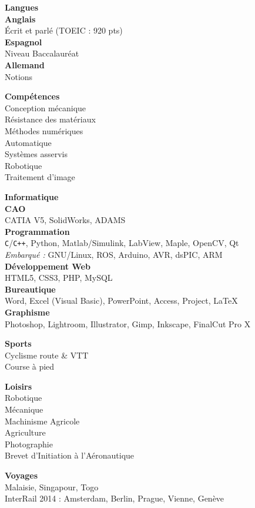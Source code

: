 \documentclass[a4paper,11pt,final]{memoir}
\newcommand{\SmallSep}{\vspace{0.5em}}
\newcommand{\SkillSection}[1]
	{\normalsize{\textbf{#1\\}}\normalfont\small}%
\newcommand{\SkillItem}[1]
	{\textbf{\color{RoyalBlue} #1}\normalfont\\}
\begin{document}
\begin{flushleft}
\SkillSection{Langues}
\SkillItem{Anglais}
Écrit et parlé (TOEIC : 920 pts)\\
\SkillItem{Espagnol}
Niveau Baccalauréat\\
\SkillItem{Allemand}
Notions
\SmallSep

\SkillSection{Compétences}
Conception mécanique\\
Résistance des matériaux\\
Méthodes numériques\\
Automatique\\
Systèmes asservis\\
Robotique\\
Traitement d'image
\SmallSep

\SkillSection{Informatique}
\SkillItem{CAO}
CATIA V5, SolidWorks, ADAMS\\
\SkillItem{Programmation}
\verb!C!/\verb!C++!, Python, Matlab/Simulink, LabView, Maple, OpenCV, Qt\\
\emph{Embarqué :} GNU/Linux, ROS, Arduino, AVR, dsPIC, ARM\\%
\SkillItem{Développement Web}
HTML5, CSS3, PHP, MySQL\\
\SkillItem{Bureautique}
Word, Excel (Visual Basic), PowerPoint, Access, Project, \LaTeX\\
\SkillItem{Graphisme}
Photoshop, Lightroom, Illustrator, Gimp, Inkscape, FinalCut Pro X\\
\SmallSep

\SkillSection{Sports}
Cyclisme route \& VTT\\
Course à pied\\
\SmallSep

\SkillSection{Loisirs}
Robotique\\
Mécanique\\
Machinisme Agricole\\
Agriculture\\
Photographie\\
Brevet d'Initiation à l'Aéronautique
\SmallSep

\SkillSection{Voyages}
Malaisie, Singapour, Togo\\
InterRail 2014 : Amsterdam, Berlin, Prague, Vienne, Genève
\end{flushleft}
\framebreak
\end{document}
